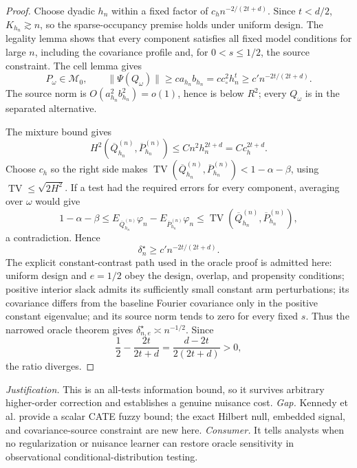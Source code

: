 \documentclass{article}
\begin{document}
\begin{proof}
Choose dyadic \(h_n\) within a fixed factor of \(c_hn^{-2/(2t+d)}\). Since \(t<d/2\), \(K_{h_n}\gtrsim n\), so the sparse-occupancy premise holds under uniform design. The legality lemma shows that every component satisfies all fixed model conditions for large \(n\), including the covariance profile and, for \(0<s\le1/2\), the source constraint. The cell lemma gives
\[
P_\omega\in\mathcal M_0,\qquad
\|\Psi(Q_\omega)\|
\ge ca_{h_n}b_{h_n}
=cc_\circ^2h_n^t
\ge c'n^{-2t/(2t+d)}. \tag{10}
\]
The source norm is \(O(a_{h_n}^2b_{h_n}^2)=o(1)\), hence is below \(R^2\); every \(Q_\omega\) is in the separated alternative.

The mixture bound gives
\[
H^2(\overline Q_{h_n}^{(n)},\overline P_{h_n}^{(n)})
\le Cn^2h_n^{2t+d}=Cc_h^{2t+d}. \tag{11}
\]
Choose \(c_h\) so the right side makes
\(\operatorname{TV}(\overline Q_{h_n}^{(n)},\overline P_{h_n}^{(n)})<1-\alpha-\beta\), using \(\operatorname{TV}\le\sqrt{2H^2}\). If a test had the required errors for every component, averaging over \(\omega\) would give
\[
1-\alpha-\beta
\le E_{\overline Q_{h_n}^{(n)}}\varphi_n
 -E_{\overline P_{h_n}^{(n)}}\varphi_n
\le\operatorname{TV}(\overline Q_{h_n}^{(n)},\overline P_{h_n}^{(n)}),
\]
a contradiction. Hence
\[
\delta_n^\star\ge c'n^{-2t/(2t+d)}.
\]
The explicit constant-contrast path used in the oracle proof is admitted here: uniform design and \(e=1/2\) obey the design, overlap, and propensity conditions; positive interior slack admits its sufficiently small constant arm perturbations; its covariance differs from the baseline Fourier covariance only in the positive constant eigenvalue; and its source norm tends to zero for every fixed \(s\). Thus the narrowed oracle theorem gives \(\delta_{n,e}^\star\asymp n^{-1/2}\). Since
\[
\frac12-\frac{2t}{2t+d}=\frac{d-2t}{2(2t+d)}>0,
\]
the ratio diverges.
\end{proof}
\par\smallskip\noindent \textit{Justification.} This is an all-tests information bound, so it survives arbitrary higher-order correction and establishes a genuine nuisance cost. \textit{Gap.} Kennedy et al. provide a scalar CATE fuzzy bound; the exact Hilbert null, embedded signal, and covariance-source constraint are new here. \textit{Consumer.} It tells analysts when no regularization or nuisance learner can restore oracle sensitivity in observational conditional-distribution testing.
\end{document}
